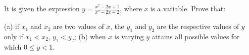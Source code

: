 It is given the expression $y=\frac{x^2-2x+1}{x^2-2x+2}$, where $x$ is a variable. Prove that:

(a) if $x_1$ and $x_2$ are two values of $x$, the $y_1$ and $y_2$ are the respective values of $y$ only if $x_1<x_2$, $y_1<y_2$;
(b) when $x$ is varying $y$ attains all possible values for which $0\le y<1$.